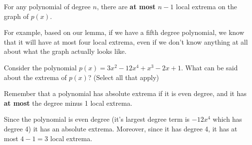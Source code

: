 \documentclass{ximera}
\begin{document}
\begin{lemma}
    For any polynomial of degree $n$, there are \textbf{at most} $n-1$ local extrema on the graph of $p(x)$.
\end{lemma}

For example, based on our lemma, if we have a fifth degree polynomial, we know that it will have at most four local extrema, even if we don't know anything at all about what the graph actually looks like. 

\begin{problem}
    Consider the polynomial $p(x) = 3x^2 -12 x^4 + x^3 - 2x + 1$. What can be said about the extrema of $p(x)$? (Select all that apply)
    \begin{selectAll}
    \end{selectAll}
    \begin{feedback}
        Remember that a polynomial has absolute extrema if it is even degree, and it has \textbf{at most} the degree minus 1 local extrema.
    \end{feedback}
    \begin{feedback}[correct]
        Since the polynomial is even degree (it's largest degree term is $-12x^4$ which has degree 4) it has an absolute extrema. Moreover, since it has degree 4, it has at most $4-1 = 3$ local extrema.
    \end{feedback}
\end{problem}
\end{document}
